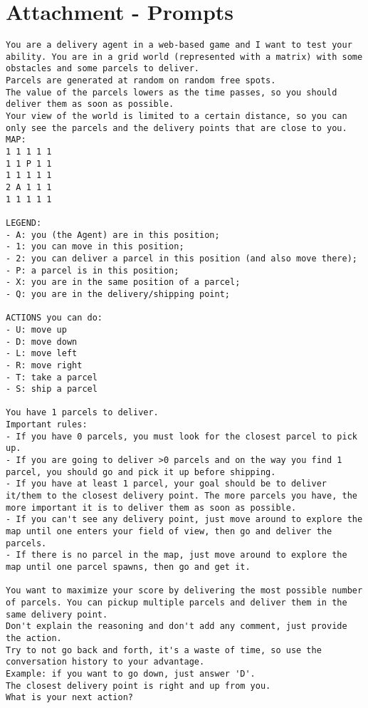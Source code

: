 \chapter{Attachment - Prompts}
\label{cha:attachment}
\clearpage
\begin{codewindow}
  [Prompt]  \begin{lstlisting}
You are a delivery agent in a web-based game and I want to test your ability. You are in a grid world (represented with a matrix) with some obstacles and some parcels to deliver.
Parcels are generated at random on random free spots.
The value of the parcels lowers as the time passes, so you should deliver them as soon as possible.
Your view of the world is limited to a certain distance, so you can only see the parcels and the delivery points that are close to you.
MAP:
1 1 1 1 1
1 1 P 1 1
1 1 1 1 1
2 A 1 1 1
1 1 1 1 1

LEGEND:
- A: you (the Agent) are in this position;
- 1: you can move in this position;
- 2: you can deliver a parcel in this position (and also move there);
- P: a parcel is in this position;
- X: you are in the same position of a parcel;
- Q: you are in the delivery/shipping point;

ACTIONS you can do:
- U: move up
- D: move down
- L: move left
- R: move right
- T: take a parcel
- S: ship a parcel

You have 1 parcels to deliver.
Important rules:
- If you have 0 parcels, you must look for the closest parcel to pick up.
- If you are going to deliver >0 parcels and on the way you find 1 parcel, you should go and pick it up before shipping.
- If you have at least 1 parcel, your goal should be to deliver it/them to the closest delivery point. The more parcels you have, the more important it is to deliver them as soon as possible.
- If you can't see any delivery point, just move around to explore the map until one enters your field of view, then go and deliver the parcels.
- If there is no parcel in the map, just move around to explore the map until one parcel spawns, then go and get it.

You want to maximize your score by delivering the most possible number of parcels. You can pickup multiple parcels and deliver them in the same delivery point.
Don't explain the reasoning and don't add any comment, just provide the action.
Try to not go back and forth, it's a waste of time, so use the conversation history to your advantage.
Example: if you want to go down, just answer 'D'.
The closest delivery point is right and up from you.
What is your next action?
\end{lstlisting}
\end{codewindow}